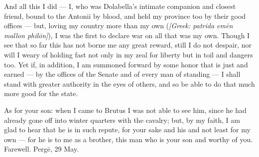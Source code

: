  And all this I did --- I, who was Dolabella's intimate companion and closest friend, bound to the Antonii by blood, and held my province too by their good offices --- but, loving my country more than my own (\textit{[Greek: patrida emēn mallon philōn]}), I was the first to declare war on all that was my own. Though I see that so far this has not borne me any great reward, still I do not despair, nor will I weary of holding fast not only in my zeal for liberty but in toil and dangers too. Yet if, in addition, I am summoned forward by some honor that is just and earned --- by the offices of the Senate and of every man of standing --- I shall stand with greater authority in the eyes of others, and so be able to do that much more good for the state.

 As for your son: when I came to Brutus I was not able to see him, since he had already gone off into winter quarters with the cavalry; but, by my faith, I am glad to hear that he is in such repute, for your sake and his and not least for my own --- for he is to me as a brother, this man who is your son and worthy of you. Farewell. Pergē, 29 May.
